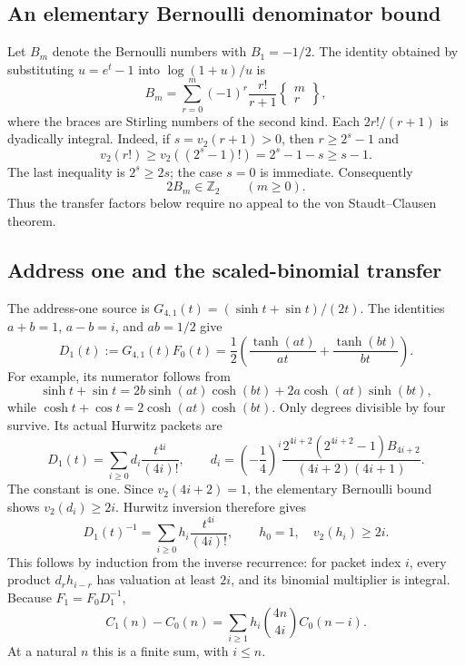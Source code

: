 \subsection{An elementary Bernoulli denominator bound}

Let $B_m$ denote the Bernoulli numbers with $B_1=-1/2$.
The identity obtained by substituting $u=e^t-1$ into
$\log(1+u)/u$ is
\begin{equation}
 B_m=\sum_{r=0}^m(-1)^r\frac{r!}{r+1}
                                  \left\{\begin{matrix}m\\r\end{matrix}\right\},
 \label{eq:bernoulli-stirling-denominator}
\end{equation}
where the braces are Stirling numbers of the second kind. Each
$2r!/(r+1)$ is dyadically integral. Indeed, if $s=v_2(r+1)>0$, then
$r\geq2^s-1$ and
\[
 v_2(r!)\geq v_2((2^s-1)!)=2^s-1-s\geq s-1.
\]
The last inequality is $2^s\geq2s$; the case $s=0$ is immediate.
Consequently
\begin{equation}
 2B_m\in\mathbb Z_2\qquad(m\geq0).
 \label{eq:elementary-bernoulli-bound}
\end{equation}
Thus the transfer factors below require no appeal to the
von Staudt--Clausen theorem.

\subsection{Address one and the scaled-binomial transfer}

The address-one source is
$G_{4,1}(t)=(\sinh t+\sin t)/(2t)$. The identities $a+b=1$,
$a-b=i$, and $ab=1/2$ give
\begin{equation}
 D_1(t):=G_{4,1}(t)F_0(t)
 =\frac12\left(\frac{\tanh(at)}{at}
                         +\frac{\tanh(bt)}{bt}\right).
 \label{eq:address-one-tangent-factor}
\end{equation}
For example, its numerator follows from
\[
 \sinh t+\sin t
 =2b\sinh(at)\cosh(bt)+2a\cosh(at)\sinh(bt),
\]
while $\cosh t+\cos t=2\cosh(at)\cosh(bt)$.
Only degrees divisible by four survive. Its actual Hurwitz packets are
\begin{equation}
 D_1(t)=\sum_{i\geq0}d_i\frac{t^{4i}}{(4i)!},\qquad
 d_i=\left(-\frac14\right)^i
 \frac{2^{4i+2}(2^{4i+2}-1)B_{4i+2}}{(4i+2)(4i+1)}.
 \label{eq:address-one-packets}
\end{equation}
The constant is one. Since $v_2(4i+2)=1$, the elementary Bernoulli bound
shows $v_2(d_i)\geq2i$. Hurwitz inversion therefore gives
\[
 D_1(t)^{-1}=\sum_{i\geq0}h_i\frac{t^{4i}}{(4i)!},
 \qquad h_0=1,\quad v_2(h_i)\geq2i.
\]
This follows by induction from the inverse recurrence: for packet index
$i$, every product $d_rh_{i-r}$ has valuation at least $2i$, and its
binomial multiplier is integral.
Because $F_1=F_0D_1^{-1}$,
\begin{equation}
 C_1(n)-C_0(n)
     =\sum_{i\geq1}h_i\binom{4n}{4i}C_0(n-i).
 \label{eq:address-one-exact-transfer}
\end{equation}
At a natural $n$ this is a finite sum, with $i\leq n$.

